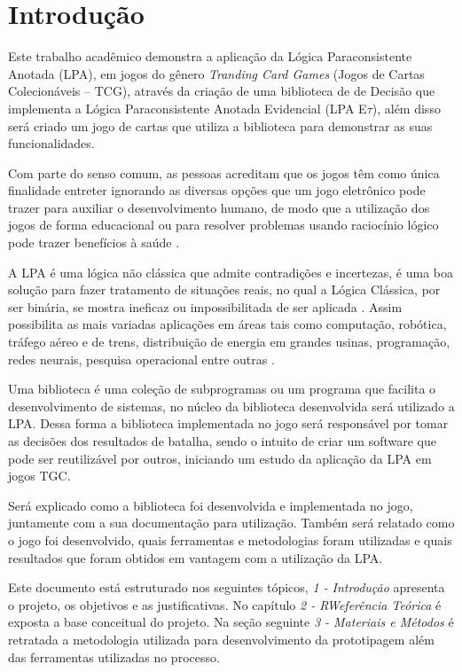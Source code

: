 
\chapter{Introdução}

Este trabalho acadêmico demonstra a aplicação da Lógica Paraconsistente Anotada (LPA), em jogos do gênero \textit{Tranding Card Games} (Jogos de Cartas Colecionáveis – TCG), através da criação de uma biblioteca de  de Decisão que implementa a Lógica Paraconsistente Anotada Evidencial (LPA E$\tau$), além disso será criado um jogo de cartas que utiliza a biblioteca para demonstrar as suas funcionalidades.

Com parte do senso comum, as pessoas acreditam que os jogos têm como única finalidade entreter ignorando as diversas opções que um jogo eletrônico pode trazer para auxiliar o desenvolvimento humano, de modo que a utilização dos jogos de forma educacional ou para resolver problemas usando raciocínio lógico pode trazer benefícios à saúde \cite{fabio-luis-lpa}.

A LPA é uma lógica não clássica que admite contradições e incertezas, é uma boa solução para fazer tratamento de situações reais, no qual a Lógica Clássica, por ser binária, se mostra ineficaz ou impossibilitada de ser aplicada \cite{metodos-lpa-2006}. Assim possibilita as mais variadas aplicações em áreas tais como computação, robótica, tráfego aéreo e de trens, distribuição de energia em grandes usinas, programação, redes neurais, pesquisa operacional entre outras \cite{tomda-decisao-lpa-2011}.

Uma biblioteca é uma coleção de subprogramas ou um programa que facilita o desenvolvimento de sistemas, no núcleo da biblioteca desenvolvida será utilizado a
LPA. Dessa forma a biblioteca implementada no jogo será responsável por tomar as decisões dos resultados de batalha, sendo o intuito de criar um software que pode ser reutilizável por outros, iniciando um estudo da aplicação da LPA em jogos TGC.

Será explicado como a biblioteca foi desenvolvida e implementada no jogo, juntamente com a sua documentação para utilização. Também será relatado como o
jogo foi desenvolvido, quais ferramentas e metodologias foram utilizadas e quais resultados que foram obtidos em vantagem com a utilização da LPA.

Este documento está estruturado nos seguintes tópicos, \textit{1 - Introdução} apresenta o projeto, os objetivos e as justificativas. No capítulo \textit{2 - RWeferência Teórica} é
exposta a base conceitual do projeto. Na seção seguinte \textit{3 - Materiais e Métodos} é retratada a metodologia utilizada para desenvolvimento da prototipagem além das ferramentas utilizadas no processo.

